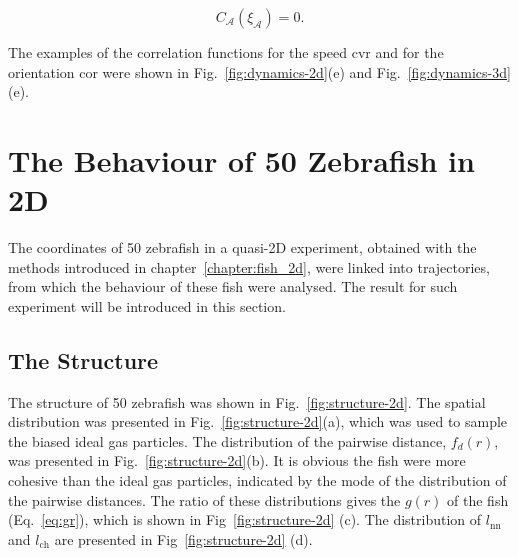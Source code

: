 \documentclass[11pt,twoside]{report}
\begin{document}
\begin{equation}
	C_{\mathcal{A}}(\xi_\mathcal{A}) = 0.
\label{eq:length-dynamics}
\end{equation}


\noindent The examples of the correlation functions for the speed \gls{cvr} and for the orientation \gls{cor} were shown in Fig.~\ref{fig:dynamics-2d}(e) and Fig.~\ref{fig:dynamics-3d}(e).





\section{The Behaviour of 50 Zebrafish in 2D}

The coordinates of 50 zebrafish in a quasi-2D experiment, obtained with the methods introduced in chapter~\ref{chapter:fish_2d}, were linked into trajectories, from which the behaviour of these fish were analysed. The result for such experiment will be introduced in this section.

\subsection{The Structure}
\label{section:analysis-structure-2d}


The structure of 50 zebrafish was shown in Fig.~\ref{fig:structure-2d}. The spatial distribution was presented in Fig.~\ref{fig:structure-2d}(a), which was used to sample the biased ideal gas particles. The distribution of the pairwise distance, $f_d(r)$, was presented in Fig.~\ref{fig:structure-2d}(b). It is obvious the fish were more cohesive than the ideal gas particles, indicated by the mode of the distribution of the pairwise distances. The ratio of these distributions gives the $g(r)$ of the fish (Eq.~\ref{eq:gr}), which is shown in Fig~\ref{fig:structure-2d} (c). The distribution of $l_\mathrm{nn}$ and $l_\mathrm{ch}$ are presented in Fig~\ref{fig:structure-2d} (d).
\end{document}
